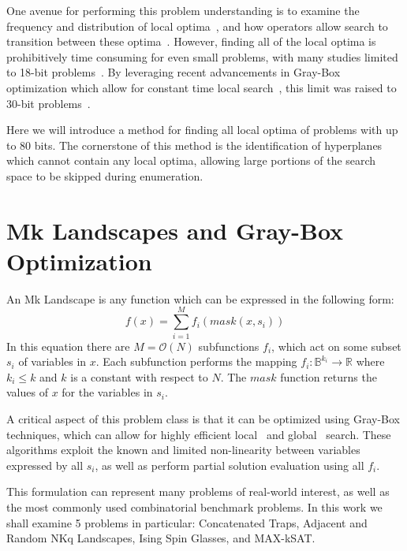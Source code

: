 \documentclass[runningheads,a4paper]{llncs}
\newcommand{\BigO}[1]{$\mathcal{O}{(#1)}$}
\begin{document}
One avenue for performing this problem understanding is to
examine the frequency and distribution of local optima~\cite{boese:1994:bigvalley},
and how operators allow search to transition between these
optima~\cite{tomassini:2008:nknetworks,verel:2011:nknetworks,ochoa:2015:crossovernetworks}.
However, finding all of the local optima is prohibitively time consuming
for even small problems, with many studies limited to 18-bit
problems~\cite{tomassini:2008:nknetworks,verel:2011:nknetworks}.
By leveraging recent advancements in Gray-Box optimization which allow for
constant time local search~\cite{chicano:2014:ball}, this limit was raised
to 30-bit problems~\cite{ochoa:2015:crossovernetworks}.

Here we will introduce a method for finding all local optima of problems
with up to 80 bits. The cornerstone of this method is the identification
of hyperplanes which cannot contain any local optima, allowing large
portions of the search space to be skipped during enumeration.



\section{Mk Landscapes and Gray-Box Optimization}
An Mk Landscape is any function which can be expressed in the following form:
\begin{equation}
  f(x) = \sum_{i=1}^{M} f_i(mask(x, s_i))
  \label{eq-mk}
\end{equation}
In this equation there are $M=$\BigO{N} subfunctions $f_i$, which act
on some subset $s_i$ of variables in $x$. Each subfunction performs the mapping
$f_i : \mathbb{B}^{k_i}\rightarrow \mathbb{R}$ where $k_i \leq k$ and $k$ is
a constant with respect to $N$. The $mask$ function returns the values of $x$ for
the variables in $s_i$.

A critical aspect of this problem class is that it can be optimized using Gray-Box
techniques, which can allow for highly efficient local~\cite{whitley:2013:greedy}
and global~\cite{goldman:2015:GBO,tintos:2015:partitioncross} search. These algorithms
exploit the known and limited non-linearity between variables expressed by all $s_i$,
as well as perform partial solution evaluation using all $f_i$.

This formulation can represent many problems of real-world interest, as well as
the most commonly used combinatorial benchmark problems. In this work we shall
examine 5 problems in particular: Concatenated Traps, Adjacent and Random NKq Landscapes,
Ising Spin Glasses, and MAX-kSAT.
\end{document}
